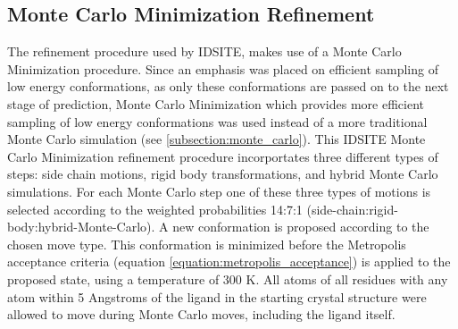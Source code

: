 \subsection{Monte Carlo Minimization Refinement}
\label{subsection:p450/mcm}
The refinement procedure used by IDSITE, makes use of a Monte Carlo Minimization procedure.
Since an emphasis was placed on efficient sampling of low energy conformations, as only these conformations are passed on to the next stage of prediction, Monte Carlo Minimization which provides more efficient sampling of low energy conformations was used instead of a more traditional Monte Carlo simulation (see \ref{subsection:monte_carlo}).
This IDSITE Monte Carlo Minimization refinement procedure incorportates three different types of steps: side chain motions, rigid body transformations, and hybrid Monte Carlo simulations.
For each Monte Carlo step one of these three types of motions is selected according to the weighted probabilities 14:7:1 (side-chain:rigid-body:hybrid-Monte-Carlo).
A new conformation is proposed according to the chosen move type.
This conformation is minimized before the Metropolis acceptance criteria (equation \ref{equation:metropolis_acceptance}) is applied to the proposed state, using a temperature of 300 K.
All atoms of all residues with any atom within 5 Angstroms of the ligand in the starting crystal structure were allowed to move during Monte Carlo moves, including the ligand itself.

